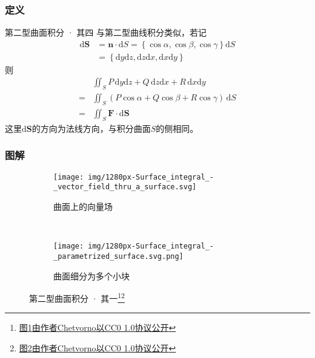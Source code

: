 \documentclass[xetex]{beamer}
\begin{document}
    \begin{frame}
        \frametitle{定义}
    
        \begin{block}{第二型曲面积分 · 其四}
            与第二型曲线积分类似，若记
            $$\begin{aligned}
                \mathrm{d}\mathbf{S} &= \mathbf{n}\cdot\mathrm{d}S=\left\{\cos\alpha,\cos\beta,\cos\gamma\right\}\mathrm{d}S \\
                &= \left\{\mathrm{d}y\mathrm{d}z,\mathrm{d}z\mathrm{d}x,\mathrm{d}x\mathrm{d}y\right\}
            \end{aligned}$$
            则
            $$\begin{aligned}
                & \iint_SP\,\mathrm{d}y\mathrm{d}z+Q\,\mathrm{d}z\mathrm{d}x+R\,\mathrm{d}x\mathrm{d}y \\
                = & \iint_S(P\cos\alpha+Q\cos\beta+R\cos\gamma)\,\mathrm{d}S \\
                = & \iint_S\mathbf{F}\cdot\mathrm{d}\mathbf{S}
            \end{aligned}$$
            这里$\mathrm{d}\mathbf{S}$的方向为法线方向，与积分曲面$S$的侧相同。
        \end{block}
    
    \end{frame}

    \begin{frame}
        \frametitle{图解}
    
        \begin{figure}[ht]
            \centering
            \begin{subfigure}[b]{.4\textwidth}
                \texttt{[image: img/1280px-Surface\_integral\_-\_vector\_field\_thru\_a\_surface.svg]}
                \caption{曲面上的向量场}
                \label{fig:intplate-1a}
            \end{subfigure}
            ~
            \begin{subfigure}[b]{.4\textwidth}
                \texttt{[image: img/1280px-Surface\_integral\_-\_parametrized\_surface.svg.png]}
                \caption{曲面细分为多个小块}
                \label{fig:intplate-1b}
            \end{subfigure}
            \caption{第二型曲面积分 · 其一\footnote[1]{\href{https://commons.wikimedia.org/wiki/File:Surface_integral_-_vector_field_thru_a_surface.svg}{图\ref{fig:intplate-1a}由作者Chetvorno以CC0 1.0协议公开}}\footnote[2]{\href{https://commons.wikimedia.org/wiki/File:Surface_integral_-_parametrized_surface.svg}{图\ref{fig:intplate-1b}由作者Chetvorno以CC0 1.0协议公开}}}
            \label{fig:intplate-1}
        \end{figure}
    
    \end{frame}
\end{document}
